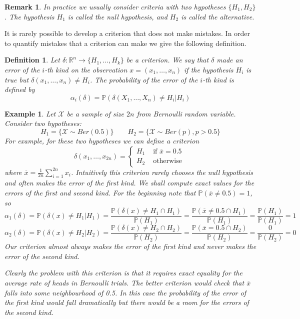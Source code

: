 \documentclass[12pt]{article}
\newtheorem{remark}[theorem]{Remark}
\newtheorem{definition}[theorem]{Definition}
\newtheorem{example}[theorem]{Example}
\begin{document}
\begin{remark} In practice we usually consider criteria with two hypotheses
    $\{H_1, H_2\}$. The hypothesis $H_1$ is called the null hypothesis, and
    $H_2$ is called the alternative.
\end{remark}

It is rarely possible to develop a criterion that does not make mistakes. In
order to quantify mistakes that a criterion can make we give the following
definition.

\begin{definition} Let $\delta:\mathbb{R}^n\to \{H_1,\ldots,H_k\}$ be a
    criterion. We say that $\delta$ made an error of the $i$-th kind on the
    observation $x=(x_1,\ldots,x_n)$ if the hypothesis $H_i$ is true but
    $\delta(x_1,\ldots,x_n)\neq H_i$. The probability of the error of the $i$-th
    kind is defined by
    $$
        \alpha_i(\delta)=\mathbb{P}(\delta(X_1,\ldots,X_n)\neq H_i | H_i)
    $$
\end{definition}

\begin{example} Let $\mathscr{X}$ be a sample of size $2n$ from Bernoulli random
    variable. Consider two hypotheses:
    $$
        H_1=\{\mathscr{X}\sim Ber(0.5)\}
        \quad\quad
        H_2=\{\mathscr{X}\sim Ber(p), p>0.5\}
    $$
    For example, for these two hypotheses we can define a criterion
    $$
        \delta(x_1,\ldots,x_{2n})
        =\begin{cases}
            H_1 & \mbox{ if } \overline{x}=0.5 \\
            H_2 & \mbox{ otherwise }
        \end{cases}
    $$
    where $\overline{x}=\frac{1}{2n}\sum_{i=1}^{2n} x_i$. Intuitively this
    criterion rarely chooses the null hypothesis and often makes the error of
    the first kind. We shall compute exact values for the errors of the first
    and second kind. For the beginning note that $\mathbb{P}(\overline{x}\neq
        0.5)=1$, so
    $$
        \alpha_1(\delta)
        =\mathbb{P}(\delta(x)\neq H_1|H_1)
        =\frac{\mathbb{P}(\delta(x)\neq H_1 \cap H_1)}{\mathbb{P}(H_1)}
        =\frac{\mathbb{P}(\overline{x}\neq 0.5 \cap H_1)}{\mathbb{P}(H_1)}
        =\frac{\mathbb{P}(H_1)}{\mathbb{P}(H_1)}
        =1
    $$
    $$
        \alpha_2(\delta)
        =\mathbb{P}(\delta(x)\neq H_2|H_2)
        =\frac{\mathbb{P}(\delta(x)\neq H_2 \cap H_2)}{\mathbb{P}(H_2)}
        =\frac{\mathbb{P}(\overline{x}= 0.5 \cap H_2)}{\mathbb{P}(H_2)}
        =\frac{0}{\mathbb{P}(H_2)}
        =0
    $$
    Our criterion almost always makes the error of the first kind and never
    makes the error of the second kind.

    Clearly the problem with this criterion is that it requires exact equality
    for the average rate of heads in Bernoulli trials. The better criterion
    would check that $\overline{x}$ falls into some neighbourhood of 0.5. In
    this case the probability of the error of the first kind would fall
    dramatically but there would be a room for the errors of the second kind.
\end{example}
\end{document}
